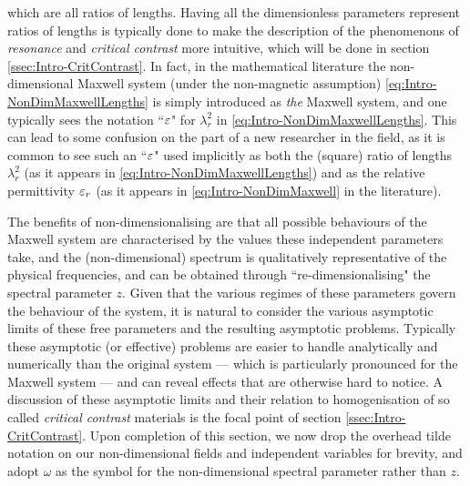 which are all ratios of lengths.
Having all the dimensionless parameters represent ratios of lengths is typically done to make the description of the phenomenons of \emph{resonance} and \emph{critical contrast} more intuitive, which will be done in section \ref{ssec:Intro-CritContrast}.
In fact, in the mathematical literature the non-dimensional Maxwell system (under the non-magnetic assumption) \eqref{eq:Intro-NonDimMaxwellLengths} is simply introduced as \emph{the} Maxwell system, and one typically sees the notation ``$\varepsilon$" for $\lambda_r^2$ in \eqref{eq:Intro-NonDimMaxwellLengths}.
This can lead to some confusion on the part of a new researcher in the field, as it is common to see such an ``$\varepsilon$" used implicitly as both the (square) ratio of lengths $\lambda_r^2$ (as it appears in \eqref{eq:Intro-NonDimMaxwellLengths}) and as the relative permittivity $\varepsilon_r$ (as it appears in \eqref{eq:Intro-NonDimMaxwell} in the literature).

The benefits of non-dimensionalising are that all possible behaviours of the Maxwell system are characterised by the values these independent parameters take, and the (non-dimensional) spectrum is qualitatively representative of the physical frequencies, and can be obtained through ``re-dimensionalising" the spectral parameter $z$.
Given that the various regimes of these parameters govern the behaviour of the system, it is natural to consider the various asymptotic limits of these free parameters and the resulting asymptotic problems.
Typically these asymptotic (or effective) problems are easier to handle analytically and numerically than the original system --- which is particularly pronounced for the Maxwell system --- and can reveal effects that are otherwise hard to notice.
A discussion of these asymptotic limits and their relation to homogenisation of so called \emph{critical contrast} materials is the focal point of section \ref{ssec:Intro-CritContrast}.
Upon completion of this section, we now drop the overhead tilde notation on our non-dimensional fields and independent variables for brevity, and adopt $\omega$ as the symbol for the non-dimensional spectral parameter rather than $z$.

